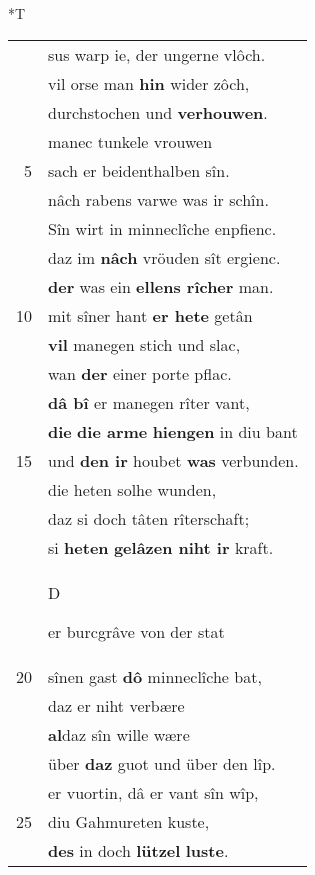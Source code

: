 \documentclass[8pt,a4paper,notitlepage]{article}
\begin{document}
\begin{table}[ht]
\begin{minipage}[t]{0.5\linewidth}
\end{minipage}
\hspace{0.5cm}
\begin{minipage}[t]{0.5\linewidth}
\small
\begin{center}*T
\end{center}
\begin{tabular}{rl}
 & sus warp ie, der ungerne vlôch.\\ 
 & vil orse man \textbf{hin} wider zôch,\\ 
 & durchstochen und \textbf{verhouwen}.\\ 
 & manec tunkele vrouwen\\ 
5 & sach er beidenthalben sîn.\\ 
 & nâch rabens varwe was ir schîn.\\ 
 & Sîn wirt in minneclîche enpfienc.\\ 
 & daz im \textbf{nâch} vröuden sît ergienc.\\ 
 & \textbf{der} was ein \textbf{ellens rîcher} man.\\ 
10 & mit sîner hant \textbf{er hete} getân\\ 
 & \textbf{vil} manegen stich und slac,\\ 
 & wan \textbf{der} einer porte pflac.\\ 
 & \textbf{dâ bî} er manegen rîter vant,\\ 
 & \textbf{die} \textbf{die arme} \textbf{hiengen} in diu bant\\ 
15 & und \textbf{den ir} houbet \textbf{was} verbunden.\\ 
 & die heten solhe wunden,\\ 
 & daz si doch tâten rîterschaft;\\ 
 & si \textbf{heten} \textbf{gelâzen niht ir} kraft.\\ 
 & \begin{large}D\end{large}er burcgrâve von der stat\\ 
20 & sînen gast \textbf{dô} minneclîche bat,\\ 
 & daz er niht verbære\\ 
 & \textbf{al}daz sîn wille wære\\ 
 & über \textbf{daz} guot und über den lîp.\\ 
 & er vuortin, dâ er vant sîn wîp,\\ 
25 & diu Gahmureten kuste,\\ 
 & \textbf{des} in doch \textbf{lützel} \textbf{luste}.\\ 

\end{tabular}
\end{minipage}
\end{table}
\end{document}
